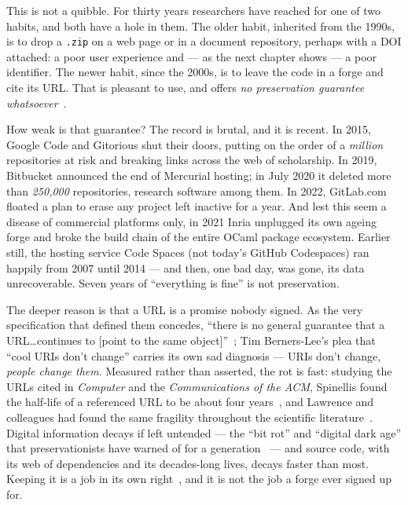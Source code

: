 This is not a quibble. For thirty years researchers have reached for one of two habits, and both
have a hole in them. The older habit, inherited from the 1990s, is to drop a \texttt{.zip} on a
web page or in a document repository, perhaps with a DOI attached: a poor user experience and ---
as the next chapter shows --- a poor identifier. The newer habit, since the 2000s, is to leave
the code in a forge and cite its URL. That is pleasant to use, and offers \emph{no preservation
guarantee whatsoever}~\autocite{SwhCACM2018}.

How weak is that guarantee? The record is brutal, and it is recent. In 2015, Google Code and
Gitorious shut their doors, putting on the order of a \emph{million} repositories at risk and
breaking links across the web of scholarship. In 2019, Bitbucket announced the end of Mercurial
hosting; in July 2020 it deleted more than \emph{250,000} repositories, research software among
them. In 2022, GitLab.com floated a plan to erase any project left inactive for a year. And lest
this seem a disease of commercial platforms only, in 2021 Inria unplugged its own ageing forge
and broke the build chain of the entire OCaml package ecosystem. Earlier still, the hosting
service Code Spaces (not today's GitHub Codespaces) ran happily from 2007 until 2014 --- and then, one bad day, was gone, its
data unrecoverable. Seven years of ``everything is fine'' is not preservation.

The deeper reason is that a URL is a promise nobody signed. As the very specification that
defined them concedes, \enquote{there is no general guarantee that a URL\ldots continues to
[point to the same object]}~\autocite{rfc1738}; Tim Berners-Lee's plea that \enquote{cool URIs don't change} carries
its own sad diagnosis --- URIs don't change, \emph{people change them}. Measured rather than
asserted, the rot is fast: studying the URLs cited in \emph{Computer} and the
\emph{Communications of the ACM}, Spinellis found the half-life of a referenced URL to be about
four years~\autocite{spinellis2003decay}, and Lawrence and colleagues had found the same
fragility throughout the scientific literature~\autocite{lawrence2001persistence}. Digital
information decays if left untended --- the ``bit rot'' and ``digital dark age'' that
preservationists have warned of for a generation~\autocite{cerf2011avoiding,anderson2015digital}
--- and source code, with its web of dependencies and its decades-long lives, decays faster than
most. Keeping it is a job in its own right~\autocite{matthews2010framework}, and it is not the
job a forge ever signed up for.

